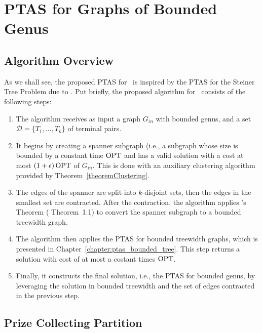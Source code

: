 \chapter{PTAS for Graphs of Bounded Genus}
\label{chapter:ptas_bounded_genus}

\section{Algorithm Overview}

As we shall see, the proposed PTAS for \steinercycle\ is inspired by the PTAS for the Steiner Tree Problem due to \cite{Bateni}. Put briefly, the proposed algorithm for \steinercycle\ consists of the following steps:

\begin{enumerate}
    \item The algorithm receives as input a graph \(G_{in}\) with bounded genus, and a set \(\mathcal{D} = \{T_1, \dots, T_k\}\) of terminal pairs.

    \item It begins by creating a spanner subgraph (i.e., a subgraph whose size is bounded by a constant time \(\operatorname{\textrm{OPT}}\) and has a valid solution with a cost at most \((1 + \epsilon) \operatorname{\textrm{OPT}}\) of \(G_{in}\). This is done with an auxiliary clustering algorithm provided by Theorem~\ref{theoremClustering}.

    \item The edges of the spanner are split into \(k\)-disjoint sets, then the edges in the smallest set are contracted. After the contraction, the algorithm applies \citeauthor{Demaine2010}'s Theorem (\cite{Demaine2010} Theorem~1.1) to convert the spanner subgraph to a bounded treewidth graph.

    \item The algorithm then applies the PTAS for bounded treewidth graphs, which is presented in Chapter~\ref{chapter:ptas_bounded_tree}. This step returns a solution with cost of at most a costant times \(\operatorname{\textrm{OPT}}\).

    \item Finally, it constructs the final solution, i.e., the PTAS for bounded genus, by leveraging the solution in bounded treewidth and the set of edges contracted in the previous step.
\end{enumerate}

\section{Prize Collecting Partition}
\label{section:pc-partition}

